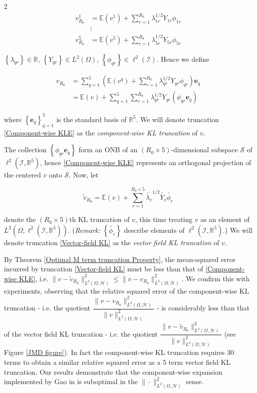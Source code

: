 \documentclass{article}
\numberwithin{theorem}{section}
\numberwithin{lemma}{section}
\numberwithin{definition}{section}
\numberwithin{assumption}{section}
\numberwithin{proposition}{section}
\numberwithin{remark}{section}
\numberwithin{corollary}{section}
\numberwithin{conjecture}{section}
\numberwithin{example}{section}
\newcommand{\R}{\mathbb{R}}
\newcommand{\E}{\mathbb{E}}
\newcommand{\bset}[1]{\left \lbrace #1 \right \rbrace}
\begin{document}
\begin{multicols*}{2}
\begin{align*}
    v^1_{R_0{}} &= \E(v^1) + \sum_{r=1}^{R_0} \lambda_{1r}^{1/2} Y_{1r} \phi_{1r} 
    \\ &\vdots \\
    v^5_{R_0} &= \E(v^5) + \sum_{r=1}^{R_0} \lambda_{5r}^{1/2} Y_{5r} \phi_{5r}  
\end{align*}

$\bset{\lambda_{qr}} \in \R$, $\bset{Y_{qr}} \in L^2(\Omega)$, $\bset{\phi_{qr}} \in \ell^2(\mathcal I)$. Hence we define 


\begin{equation} \label{Component-wise KLE}
\begin{split}
    v_{R_0} &= 
\sum_{q=1}^5 \left( \E(v^q) + \sum_{r=1}^{R_0} \lambda_{qr}^{1/2} Y_{qr} \phi_{qr} \right) \mathbf e_q
\\&=
\E(v) + \sum_{q=1}^5  \sum_{r=1}^{R_0} \lambda_{qr}^{1/2} Y_{qr} (\phi_{qr} \mathbf e_q)
\end{split}
\end{equation}


where $\bset{\mathbf e_q}_{q=1}^5$ is the standard basis of $\R^5$. We will denote truncation \eqref{Component-wise KLE} as the \textit{component-wise KL truncation} of $v$. 

The collection $\bset{\phi_{qr}\mathbf e_q}$ form an ONB of an $(R_0 \times 5)$-dimensional subspace $\mathcal S$ of $\ell^2(\mathcal I, \R^5)$, hence \eqref{Component-wise KLE} represents an orthogonal projection of the centered $v$ onto $\mathcal S$. Now, let 

\begin{equation} \label{Vector-field KL}
\tilde v_{R_0} = \E(v) + \sum_{r=1}^{R_0 \times 5} \tilde{\lambda_r}^{1/2} \tilde{Y_r} \tilde{\phi_r}
\end{equation}

denote the $(R_0 \times 5)$th KL truncation of $v$, this time treating $v$ as an element of $L^2(\Omega, \ell^2(\mathcal I, \R^5))$. (\textit{Remark:} $\bset{\tilde{\phi_r}}$ describe elements of $\ell^2(\mathcal I, \R^5)$.) We will denote truncation \eqref{Vector-field KL} as the \textit{vector field KL truncation} of $v$. 

By Theorem \ref{Optimal M term truncation Property}, the mean-squared error incurred by truncation \eqref{Vector-field KL} must be less than that of \eqref{Component-wise KLE}, i.e. $\|v-\tilde v_{R_0}\|^2_{L^2(\Omega, \mathcal H)} \leq \|v-v_{R_0}\|^2_{L^2(\Omega, \mathcal H)}$. We confirm this with experiments, observing that the relative squared error of the component-wise KL truncation - i.e. the quotient $\dfrac{\|v - v_{R_0}\|^2_{L^2(\Omega, \mathcal H)} }{ \|v\|^2_{L^2(\Omega, \mathcal H)} }$ - is considerably less than that of the vector field KL truncation - i.e. the quotient $\dfrac{\|v - \tilde v_{R_0}\|^2_{L^2(\Omega, \mathcal H)} }{ \|v\|^2_{L^2(\Omega, \mathcal H)} }$ (see Figure \ref{JMD figure}). In fact the component-wise KL truncation requires 30 terms to obtain a similar relative squared error as a 5 term vector field KL truncation. Our results demonstrate that the component-wise expansion implemented by Gao in \cite{gao2017} is suboptimal in the $\|\cdot\|_{L^2(\Omega, \mathcal H)}^2$ sense.


\end{multicols*}
\end{document}
